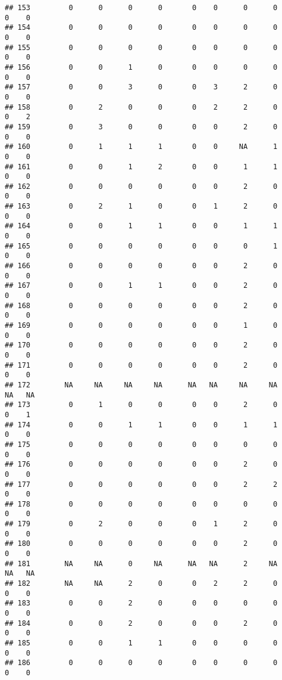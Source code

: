 \documentclass[
]{article}
\begin{document}
\begin{verbatim}
## 153         0      0      0      0       0    0      0      0       0    0
## 154         0      0      0      0       0    0      0      0       0    0
## 155         0      0      0      0       0    0      0      0       0    0
## 156         0      0      1      0       0    0      0      0       0    0
## 157         0      0      3      0       0    3      2      0       0    0
## 158         0      2      0      0       0    2      2      0       0    2
## 159         0      3      0      0       0    0      2      0       0    0
## 160         0      1      1      1       0    0     NA      1       0    0
## 161         0      0      1      2       0    0      1      1       0    0
## 162         0      0      0      0       0    0      2      0       0    0
## 163         0      2      1      0       0    1      2      0       0    0
## 164         0      0      1      1       0    0      1      1       0    0
## 165         0      0      0      0       0    0      0      1       0    0
## 166         0      0      0      0       0    0      2      0       0    0
## 167         0      0      1      1       0    0      2      0       0    0
## 168         0      0      0      0       0    0      2      0       0    0
## 169         0      0      0      0       0    0      1      0       0    0
## 170         0      0      0      0       0    0      2      0       0    0
## 171         0      0      0      0       0    0      2      0       0    0
## 172        NA     NA     NA     NA      NA   NA     NA     NA      NA   NA
## 173         0      1      0      0       0    0      2      0       0    1
## 174         0      0      1      1       0    0      1      1       0    0
## 175         0      0      0      0       0    0      0      0       0    0
## 176         0      0      0      0       0    0      2      0       0    0
## 177         0      0      0      0       0    0      2      2       0    0
## 178         0      0      0      0       0    0      0      0       0    0
## 179         0      2      0      0       0    1      2      0       0    0
## 180         0      0      0      0       0    0      2      0       0    0
## 181        NA     NA      0     NA      NA   NA      2     NA      NA   NA
## 182        NA     NA      2      0       0    2      2      0       0    0
## 183         0      0      2      0       0    0      0      0       0    0
## 184         0      0      2      0       0    0      2      0       0    0
## 185         0      0      1      1       0    0      0      0       0    0
## 186         0      0      0      0       0    0      0      0       0    0

\end{verbatim}
\end{document}
